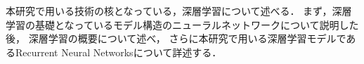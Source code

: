 本研究で用いる技術の核となっている，深層学習について述べる．
まず，深層学習の基礎となっているモデル構造のニューラルネットワークについて説明した後，
深層学習の概要について述べ，
さらに本研究で用いる深層学習モデルであるRecurrent Neural Networksについて詳述する．

%
%


%
%
%
%
%


